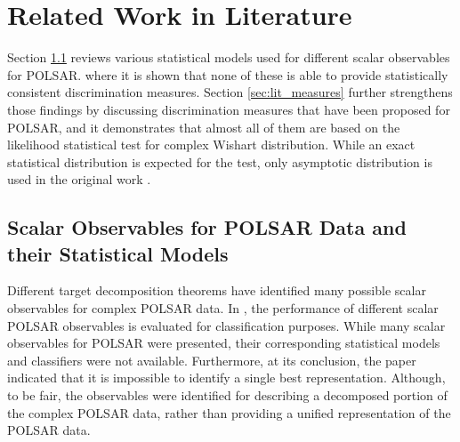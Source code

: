 \documentclass[journal]{IEEEtran}
\begin{document}
\section{Related Work in Literature}
\label{sec:lit_review}

Section \ref{sec:lit_models} reviews various statistical models used for different scalar observables for POLSAR.
  where it is shown that none of these is able to provide statistically consistent discrimination measures. 
Section \ref{sec:lit_measures} further strengthens those findings by discussing discrimination measures that have been proposed for POLSAR,
  and it demonstrates that almost all of them are based on the likelihood statistical test for complex Wishart distribution.
While an exact statistical distribution is expected for the test,
  only asymptotic distribution is used in the original work \cite{Conradsen_2003_TGRS_4}.
  
\subsection{Scalar Observables for POLSAR Data and their Statistical Models}
\label{sec:lit_models}

Different target decomposition theorems have identified many possible scalar observables for complex POLSAR data.
In \cite{Alberga_2008_IJRS_4129}, the performance of different scalar POLSAR observables is evaluated for classification purposes.
While many scalar observables for POLSAR were presented, their corresponding statistical models and classifiers were not available.
Furthermore, at its conclusion, the paper indicated that it is impossible to identify a single best representation.
Although, to be fair, the observables were identified for describing a decomposed portion of the complex POLSAR data,
  rather than providing a unified representation of the POLSAR data.
\end{document}

